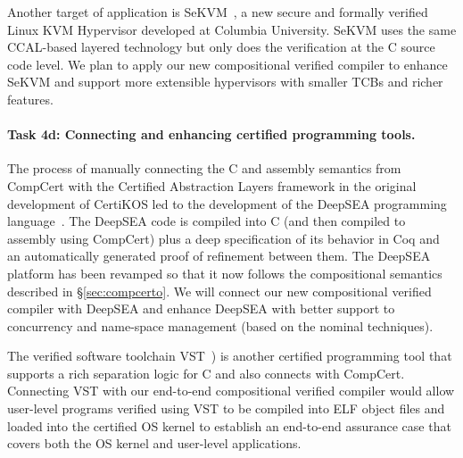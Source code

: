 Another target of application is SeKVM~\cite{sekvm21a,sekvm21b,tao21},
a new secure and formally verified Linux KVM Hypervisor developed at
Columbia University. SeKVM uses the same CCAL-based layered technology 
but only does the verification at the C source code level. We plan to
apply our new compositional verified compiler to enhance SeKVM and support
more extensible hypervisors with smaller TCBs and richer features.


\vspace*{-2ex}
\paragraph*{Task 4d: Connecting and enhancing certified programming tools.}
The process of manually connecting the C and assembly semantics from
CompCert with the Certified Abstraction Layers framework in the
original development of CertiKOS led to the development of the DeepSEA
programming language~\cite{deepsea19}.  The DeepSEA code is compiled
into C (and then compiled to assembly using CompCert) plus a deep
specification of its behavior in Coq and an automatically generated
proof of refinement between them. The DeepSEA platform has been
revamped so that it now follows the compositional semantics described
in \S\ref{sec:compcerto}. We will connect our new compositional
verified compiler with DeepSEA and enhance DeepSEA with better support
to concurrency and name-space management (based on the nominal techniques).

The verified software toolchain VST~\cite{appel11:vst}) is another
certified programming tool that supports a rich separation logic for C
and also connects with CompCert. Connecting VST with our end-to-end
compositional verified compiler would allow user-level programs
verified using VST to be compiled into ELF object files and loaded
into the certified OS kernel to establish an end-to-end assurance case
that covers both the OS kernel and user-level applications.

